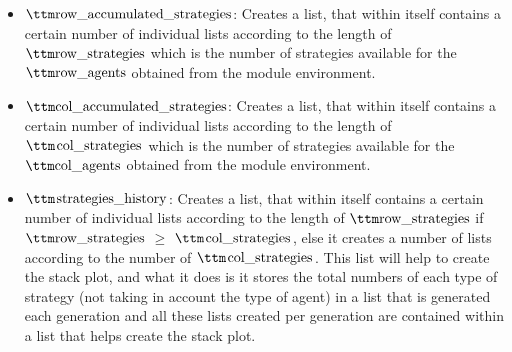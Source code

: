 \begin{itemize}
	\item$\pythoninline{row\_accumulated\_strategies}$: Creates a list, that within itself contains a certain number of individual lists according to the length of $\pythoninline{row\_strategies}$ which is the number of strategies available for the $\pythoninline{row\_agents}$ obtained from the module environment.
	\item$\pythoninline{col\_accumulated\_strategies}$: Creates a list, that within itself contains a certain number of individual lists according to the length of $\pythoninline{col\_strategies}$ which is the number of strategies available for the $\pythoninline{col\_agents}$ obtained from the module environment.
	\item$\pythoninline{strategies\_history}$: Creates a list, that within itself contains a certain number of individual lists according to the length of $\pythoninline{row\_strategies}$ if $\pythoninline{row\_strategies}$ $\geq$ $\pythoninline{col\_strategies}$, else it creates a number of lists according to the number of $\pythoninline{col\_strategies}$. This list will help to create the stack plot, and what it does is it stores the total numbers of each type of strategy (not taking in account the type of agent) in a list that is generated each generation and all these lists created per generation are contained within a list that helps create the stack plot.

\end{itemize}

